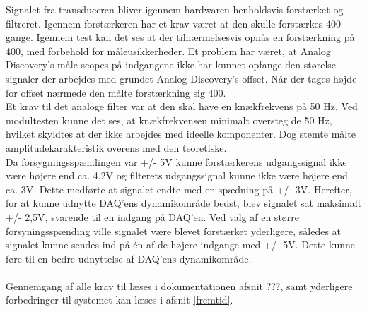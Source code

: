 Signalet fra transduceren bliver igennem hardwaren henholdsvis forstærket og filtreret. Igennem forstærkeren har et krav været at den skulle forstærkes 400 gange. Igennem test kan det ses at der tilnærmelsesvis opnås en forstærkning på 400, med forbehold for måleusikkerheder. Et problem har været, at Analog Discovery’s måle scopes på indgangene ikke har kunnet opfange den størelse signaler der arbejdes med grundet Analog Discovery’s offset. Når der tages højde for offset nærmede den målte forstærkning sig 400. \\
Et krav til det analoge filter var at den skal have en knækfrekvens på 50 Hz. Ved modultesten kunne det ses, at knækfrekvensen minimalt oversteg de 50 Hz, hvilket skyldtes at der ikke arbejdes med ideelle komponenter. Dog stemte målte amplitudekarakteristik overens med den teoretiske. \\
Da forsygningsspændingen var +/- 5V kunne forstærkerens udgangssignal ikke være højere end ca. 4,2V og filterets udgangssignal kunne ikke være højere end ca. 3V. Dette medførte at signalet endte med en spædning på +/- 3V. Herefter, for at kunne udnytte DAQ’ens dynamikområde bedst, blev signalet sat maksimalt +/- 2,5V, svarende til en indgang på DAQ’en. Ved valg af en større forsyningsspænding ville signalet være blevet forstærket yderligere, således at signalet kunne sendes ind på én af de højere indgange med +/- 5V. Dette kunne føre til en bedre udnyttelse af DAQ'ens dynamikområde.\\
\\
Gennemgang af alle krav til læses i dokumentationen afsnit ???, samt yderligere forbedringer til systemet kan læses i afsnit \ref{fremtid}.
